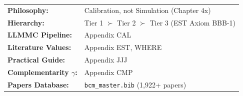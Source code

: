 
\begin{abstract}
This appendix serves as the \textbf{single entry point} for understanding how to parameterize any EBF model component. Parameterization methodology is distributed across 10+ appendices and 6+ chapters - this reference consolidates the complete landscape into one navigable map. \textbf{Core principle:} EBF uses \textit{calibration on experimental evidence}, not simulation. Three tiers exist: (1) Hard Empirical, (2) Meta-Analytical, (3) Synthetic/LLMMC. This appendix answers: "I need a parameter value - where do I start and what method applies?"
\end{abstract}


\begin{tcolorbox}[colback=blue!5!white, colframe=blue!75!black, title=Quick Reference: Parameter Methodology]
\small
\begin{tabular}{ll}
\textbf{Philosophy:} & Calibration, not Simulation (Chapter 4x) \\
\textbf{Hierarchy:} & Tier 1 $\succ$ Tier 2 $\succ$ Tier 3 (EST Axiom BBB-1) \\
\textbf{LLMMC Pipeline:} & Appendix CAL \\
\textbf{Literature Values:} & Appendix EST, WHERE \\
\textbf{Practical Guide:} & Appendix JJJ \\
\textbf{Complementarity $\gamma$:} & Appendix CMP \\
\textbf{Papers Database:} & \texttt{bcm\_master.bib} (1,922+ papers) \\
\end{tabular}
\end{tcolorbox}


